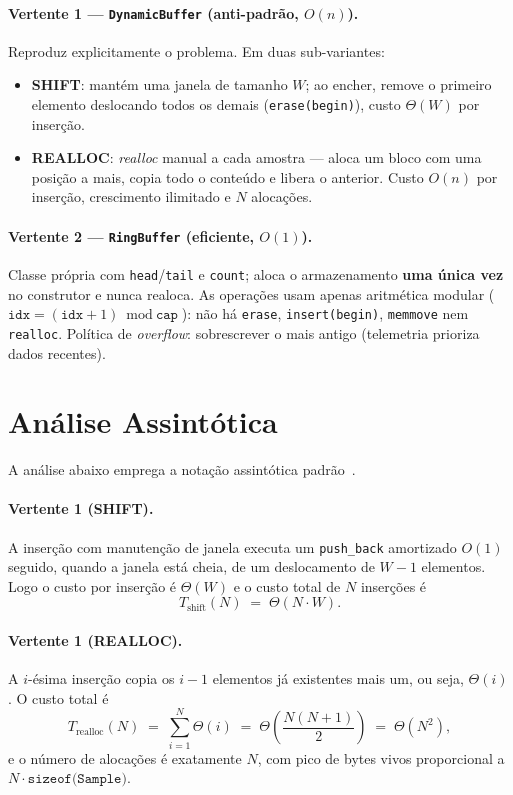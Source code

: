 \documentclass[11pt,a4paper]{article}
\begin{document}
\paragraph{Vertente 1 --- \texttt{DynamicBuffer} (anti-padrão, $O(n)$).}
Reproduz explicitamente o problema. Em duas sub-variantes:
\begin{itemize}
  \item \textbf{SHIFT}: mantém uma janela de tamanho $W$; ao encher, remove o
  primeiro elemento deslocando todos os demais (\texttt{erase(begin)}), custo
  $\Theta(W)$ por inserção.
  \item \textbf{REALLOC}: \emph{realloc} manual a cada amostra --- aloca um bloco
  com uma posição a mais, copia todo o conteúdo e libera o anterior. Custo $O(n)$
  por inserção, crescimento ilimitado e $N$ alocações.
\end{itemize}

\paragraph{Vertente 2 --- \texttt{RingBuffer} (eficiente, $O(1)$).}
Classe própria com \texttt{head}/\texttt{tail} e \texttt{count}; aloca o
armazenamento \textbf{uma única vez} no construtor e nunca realoca. As operações
usam apenas aritmética modular ($\texttt{idx} = (\texttt{idx}+1) \bmod
\texttt{cap}$): não há \texttt{erase}, \texttt{insert(begin)}, \texttt{memmove}
nem \texttt{realloc}. Política de \emph{overflow}: sobrescrever o mais antigo
(telemetria prioriza dados recentes).

\section{Análise Assintótica}

A análise abaixo emprega a notação assintótica padrão~\cite{cormen2009}.

\paragraph{Vertente 1 (SHIFT).} A inserção com manutenção de janela executa um
\texttt{push\_back} amortizado $O(1)$ seguido, quando a janela está cheia, de um
deslocamento de $W-1$ elementos. Logo o custo por inserção é $\Theta(W)$ e o
custo total de $N$ inserções é
\[
T_{\text{shift}}(N) \;=\; \Theta(N \cdot W).
\]

\paragraph{Vertente 1 (REALLOC).} A $i$-ésima inserção copia os $i-1$ elementos
já existentes mais um, ou seja, $\Theta(i)$. O custo total é
\[
T_{\text{realloc}}(N) \;=\; \sum_{i=1}^{N} \Theta(i)
\;=\; \Theta\!\left(\frac{N(N+1)}{2}\right) \;=\; \Theta(N^2),
\]
e o número de alocações é exatamente $N$, com pico de bytes vivos proporcional a
$N \cdot \texttt{sizeof(Sample)}$.
\end{document}
